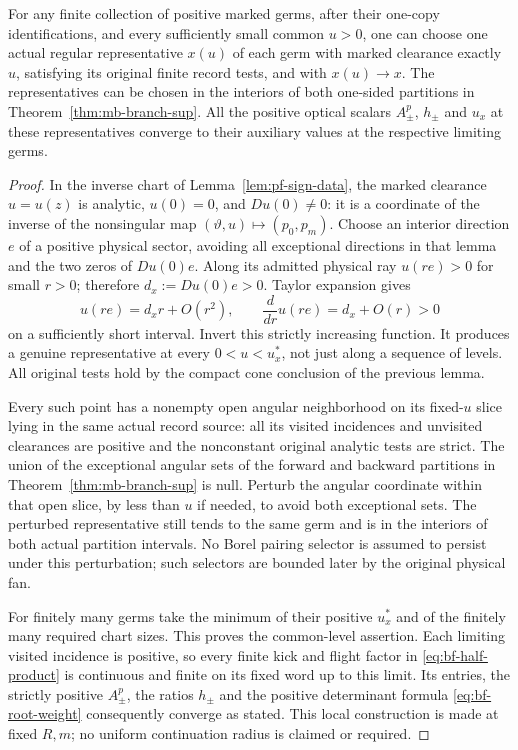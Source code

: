\begin{lemma}
\label{lem:pf-representatives}
For any finite collection of positive marked germs, after their
one-copy identifications, and every sufficiently small common
$u>0$, one can choose one actual regular representative $x(u)$
of each germ with marked clearance exactly $u$, satisfying its
original finite record tests, and with $x(u)\longrightarrow x$.
The representatives can be chosen in the interiors of both
one-sided partitions in Theorem~\ref{thm:mb-branch-sup}.
All the positive optical scalars $A_\pm^p$, $h_\pm$ and $u_x$
at these representatives converge to their auxiliary values at
the respective limiting germs.
\end{lemma}
\begin{proof}
In the inverse chart of Lemma~\ref{lem:pf-sign-data}, the marked
clearance $u=u(z)$ is analytic, $u(0)=0$, and $D u(0)\ne0$:
it is a coordinate of the inverse of the nonsingular map
$(\vartheta,u)\mapsto(p_0,p_m)$.  Choose an interior direction
$e$ of a positive physical sector, avoiding all exceptional
directions in that lemma and the two zeros of $D u(0)e$.
Along its admitted physical ray $u(r e)>0$ for small $r>0$;
therefore $d_x:=D u(0)e>0$.  Taylor expansion gives
\[
       u(r e)=d_xr+O(r^2),\qquad
       \frac{d}{dr}u(r e)=d_x+O(r)>0
\]
on a sufficiently short interval.  Invert this strictly increasing
function.  It produces a genuine representative at every
$0<u<u_x^*$, not just along a sequence of levels.  All original
tests hold by the compact cone conclusion of the previous lemma.

Every such point has a nonempty open angular neighborhood on its
fixed-$u$ slice lying in the same actual record source: all its
visited incidences and unvisited clearances are positive and the
nonconstant original analytic tests are strict.  The union of the
exceptional angular sets of the forward and backward partitions
in Theorem~\ref{thm:mb-branch-sup} is null.  Perturb the angular
coordinate within that open slice, by less than $u$ if needed,
to avoid both exceptional sets.  The perturbed representative
still tends to the same germ and is in the interiors of both
actual partition intervals.  No Borel pairing selector is assumed
to persist under this perturbation; such selectors are bounded
later by the original physical fan.

For finitely many germs take the minimum of their positive
$u_x^*$ and of the finitely many required chart sizes.  This proves
the common-level assertion.  Each limiting visited incidence is
positive, so every finite kick and flight factor in
\eqref{eq:bf-half-product} is continuous and finite on its fixed
word up to this limit.  Its entries, the strictly positive
$A_\pm^p$, the ratios $h_\pm$ and the positive determinant formula
\eqref{eq:bf-root-weight} consequently converge as stated.
This local construction is made at fixed $R,m$; no uniform
continuation radius is claimed or required.
\end{proof}

